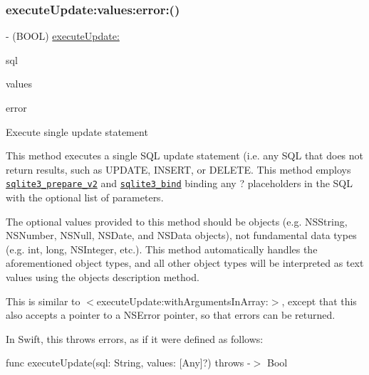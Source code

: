 \subsubsection{\texorpdfstring{execute\+Update\+:values\+:error\+:()}{executeUpdate:values:error:()}}
{\footnotesize\ttfamily -\/ (B\+O\+OL) \mbox{\hyperlink{interface_o_p_t_l_y_f_m_d_b_database_aacce81f6c3456a804e1d558462bca313}{execute\+Update\+:}} \begin{DoxyParamCaption}\item[{(N\+S\+String $\ast$)}]{sql }\item[{values:(N\+S\+Array $\ast$\+\_\+\+Nullable)}]{values }\item[{error:(N\+S\+Error $\ast$\+\_\+\+Nullable \+\_\+\+\_\+autoreleasing $\ast$)}]{error }\end{DoxyParamCaption}}

Execute single update statement

This method executes a single S\+QL update statement (i.\+e. any S\+QL that does not return results, such as {\ttfamily U\+P\+D\+A\+TE}, {\ttfamily I\+N\+S\+E\+RT}, or {\ttfamily D\+E\+L\+E\+TE}. This method employs \href{http://sqlite.org/c3ref/prepare.html}{\tt {\ttfamily sqlite3\+\_\+prepare\+\_\+v2}} and \href{http://sqlite.org/c3ref/bind_blob.html}{\tt {\ttfamily sqlite3\+\_\+bind}} binding any {\ttfamily ?} placeholders in the S\+QL with the optional list of parameters.

The optional values provided to this method should be objects (e.\+g. {\ttfamily N\+S\+String}, {\ttfamily N\+S\+Number}, {\ttfamily N\+S\+Null}, {\ttfamily N\+S\+Date}, and {\ttfamily N\+S\+Data} objects), not fundamental data types (e.\+g. {\ttfamily int}, {\ttfamily long}, {\ttfamily N\+S\+Integer}, etc.). This method automatically handles the aforementioned object types, and all other object types will be interpreted as text values using the object\textquotesingle{}s {\ttfamily description} method.

This is similar to {\ttfamily $<$execute\+Update\+:with\+Arguments\+In\+Array\+:$>$}, except that this also accepts a pointer to a {\ttfamily N\+S\+Error} pointer, so that errors can be returned.

In Swift, this throws errors, as if it were defined as follows\+:

{\ttfamily func execute\+Update(sql\+: String, values\+: \mbox{[}Any\mbox{]}?) throws -\/$>$ Bool}


